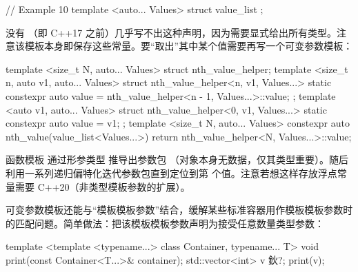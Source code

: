 \begin{code}
// Example 10
template <auto... Values> struct value_list {};
\end{code}

没有 （即 C++17 之前）几乎写不出这种声明，因为需要显式给出所有类型。注意该模板本身即保存这些常量。要“取出”其中某个值需要再写一个可变参数模板：

\begin{code}
template <size_t N, auto... Values>
struct nth_value_helper;
template <size_t n, auto v1, auto... Values>
struct nth_value_helper<n, v1, Values...> {
  static constexpr auto value =
    nth_value_helper<n - 1, Values...>::value;
};
template <auto v1, auto... Values>
struct nth_value_helper<0, v1, Values...> {
  static constexpr auto value = v1;
};
template <size_t N, auto... Values>
constexpr auto nth_value(value_list<Values...>) {
  return nth_value_helper<N, Values...>::value;
}
\end{code}

函数模板  通过形参类型  推导出参数包 （对象本身无数据，仅其类型重要）。随后利用一系列递归偏特化迭代参数包直到定位到第  个值。注意若想这样存放浮点常量需要 C++20（非类型模板参数的扩展）。

可变参数模板还能与“模板模板参数”结合，缓解某些标准容器用作模板模板参数时的匹配问题。简单做法：把该模板模板参数声明为接受任意数量类型参数：

\begin{code}
template <template <typename...> class Container,
         typename... T>
void print(const Container<T...>& container);
std::vector<int> v{ 鈥?};
print(v);
\end{code}

